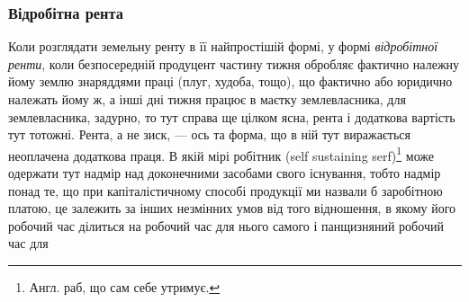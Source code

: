 \subsubsection{Відробітна рента}

Коли розглядати земельну ренту в її найпростішій формі, у формі \emph{відробітної
ренти}, коли безпосередній продуцент частину тижня обробляє фактично
належну йому землю знаряддями праці (плуг, худоба, тощо), що фактично
або юридично належать йому ж, а інші дні тижня працює в маєтку землевласника,
для землевласника, задурно, то тут справа ще цілком ясна, рента і додаткова вартість
тут тотожні. Рента, а не зиск, — ось та форма, що в ній тут виражається неоплачена
додаткова праця. В якій мірі робітник (self sustaining serf)\footnote*{
Англ. раб, що сам себе утримує. 
} може одержати тут
надмір над доконечними засобами свого існування, тобто надмір понад те, що
при капіталістичному способі продукції ми назвали б заробітною платою, це
залежить за інших незмінних умов від того відношення, в якому його робочий
час ділиться на робочий час для нього самого і панщизняний робочий час для
\parbreak{}  %
